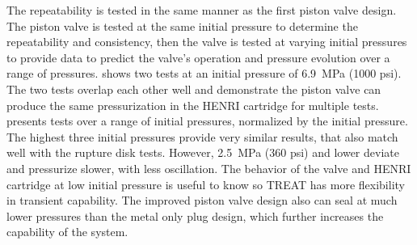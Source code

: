 The repeatability is tested in the same manner as the first piston valve design. The piston valve is tested at the same initial pressure to determine the repeatability and consistency, then the valve is tested at varying initial pressures to provide data to predict the valve's operation and pressure evolution over a range of pressures.  shows two tests at an initial pressure of \SI{6.9}{\mega\pascal} (1000 psi). The two tests overlap each other well and demonstrate the piston valve can produce the same pressurization in the HENRI cartridge for multiple tests.  presents tests over a range of initial pressures, normalized by the initial pressure. The highest three initial pressures provide very similar results, that also match well with the rupture disk tests. However, \SI{2.5}{\mega\pascal} (360 psi) and lower deviate and pressurize slower, with less oscillation. The behavior of the valve and HENRI cartridge at low initial pressure is useful to know so TREAT has more flexibility in transient capability. The improved piston valve design also can seal at much lower pressures than the metal only plug design, which further increases the capability of the system.











